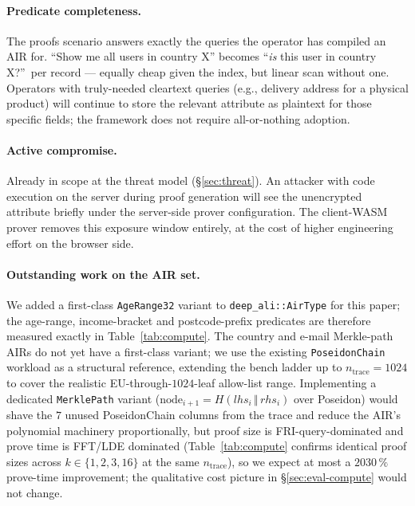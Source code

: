 \documentclass[11pt,a4paper]{article}
\begin{document}
\paragraph{Predicate completeness.}  The proofs scenario answers
exactly the queries the operator has compiled an AIR for.  ``Show
me all users in country X'' becomes ``\emph{is} this user in country
X?''~per record — equally cheap given the index, but linear scan
without one.  Operators with truly\nobreakdash-needed cleartext
queries (e.g., delivery address for a physical product) will
continue to store the relevant attribute as plaintext for those
specific fields; the framework does not require all\nobreakdash-or\nobreakdash-nothing
adoption.

\paragraph{Active compromise.}  Already in scope at the threat
model (\S\ref{sec:threat}).  An attacker with code execution on
the server during proof generation will see the unencrypted
attribute briefly under the server\nobreakdash-side prover
configuration.  The client\nobreakdash-WASM prover removes this
exposure window entirely, at the cost of higher engineering effort
on the browser side.

\paragraph{Outstanding work on the AIR set.}  We added a
first\nobreakdash-class \texttt{AgeRange32} variant to
\texttt{deep\_ali::AirType} for this paper; the
age\nobreakdash-range, income\nobreakdash-bracket and
postcode\nobreakdash-prefix predicates are therefore measured
exactly in Table~\ref{tab:compute}.  The country and
e\nobreakdash-mail Merkle\nobreakdash-path AIRs do not yet have a
first\nobreakdash-class variant; we use the existing
\texttt{PoseidonChain} workload as a structural reference,
extending the bench ladder up to $n_\mathrm{trace} = 1024$ to
cover the realistic
EU\nobreakdash-through\nobreakdash-$1024$\nobreakdash-leaf
allow\nobreakdash-list range.  Implementing a dedicated
\texttt{MerklePath} variant ($\mathrm{node}_{i+1} =
H(\mathit{lhs}_i \,\Vert\, \mathit{rhs}_i)$ over Poseidon) would
shave the $7$ unused PoseidonChain columns from the trace and
reduce the AIR's polynomial machinery proportionally, but
proof size is FRI\nobreakdash-query\nobreakdash-dominated and
prove time is FFT/LDE dominated (Table~\ref{tab:compute} confirms
identical proof sizes across $k \in \{1, 2, 3, 16\}$ at the same
$n_\mathrm{trace}$), so we expect at most a $20$\textendash$30\,\%$
prove\nobreakdash-time improvement; the qualitative cost picture
in \S\ref{sec:eval-compute} would not change.
\end{document}
